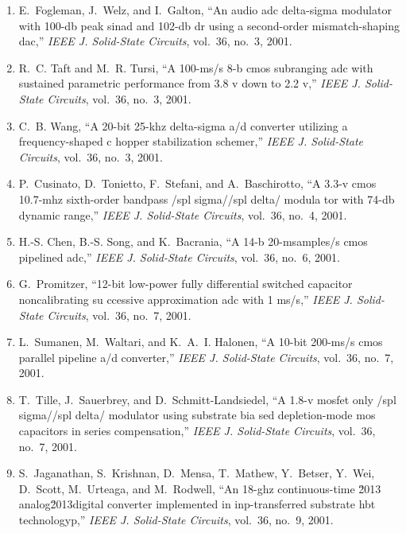 \begin{enumerate}
\item
E.~Fogleman, J.~Welz, and I.~Galton, ``An audio adc delta-sigma modulator with
  100-db peak sinad and 102-db dr using a second-order mismatch-shaping dac,''
  \emph{{IEEE} J. Solid-State Circuits}, vol.~36, no.~3, 2001.

\item
R.~C. Taft and M.~R. Tursi, ``A 100-ms/s 8-b cmos subranging adc with sustained
  parametric performance from 3.8 v down to 2.2 v,'' \emph{{IEEE} J.
  Solid-State Circuits}, vol.~36, no.~3, 2001.

\item
C.~B. Wang, ``A 20-bit 25-khz delta-sigma a/d converter utilizing a
  frequency-shaped c hopper stabilization schemer,'' \emph{{IEEE} J.
  Solid-State Circuits}, vol.~36, no.~3, 2001.

\item
P.~Cusinato, D.~Tonietto, F.~Stefani, and A.~Baschirotto, ``A 3.3-v cmos
  10.7-mhz sixth-order bandpass /spl sigma//spl delta/ modula tor with 74-db
  dynamic range,'' \emph{{IEEE} J. Solid-State Circuits}, vol.~36, no.~4, 2001.

\item
H.-S. Chen, B.-S. Song, and K.~Bacrania, ``A 14-b 20-msamples/s cmos pipelined
  adc,'' \emph{{IEEE} J. Solid-State Circuits}, vol.~36, no.~6, 2001.

\item
G.~Promitzer, ``12-bit low-power fully differential switched capacitor
  noncalibrating su ccessive approximation adc with 1 ms/s,'' \emph{{IEEE} J.
  Solid-State Circuits}, vol.~36, no.~7, 2001.

\item
L.~Sumanen, M.~Waltari, and K.~A.~I. Halonen, ``A 10-bit 200-ms/s cmos parallel
  pipeline a/d converter,'' \emph{{IEEE} J. Solid-State Circuits}, vol.~36,
  no.~7, 2001.

\item
T.~Tille, J.~Sauerbrey, and D.~Schmitt-Landsiedel, ``A 1.8-v mosfet only /spl
  sigma//spl delta/ modulator using substrate bia sed depletion-mode mos
  capacitors in series compensation,'' \emph{{IEEE} J. Solid-State Circuits},
  vol.~36, no.~7, 2001.

\item
S.~Jaganathan, S.~Krishnan, D.~Mensa, T.~Mathew, Y.~Betser, Y.~Wei, D.~Scott,
  M.~Urteaga, and M.~Rodwell, ``An 18-ghz continuous-time \u2013
  analog\u2013digital converter implemented in inp-transferred substrate hbt
  technologyp,'' \emph{{IEEE} J. Solid-State Circuits}, vol.~36, no.~9, 2001.


\end{enumerate}
